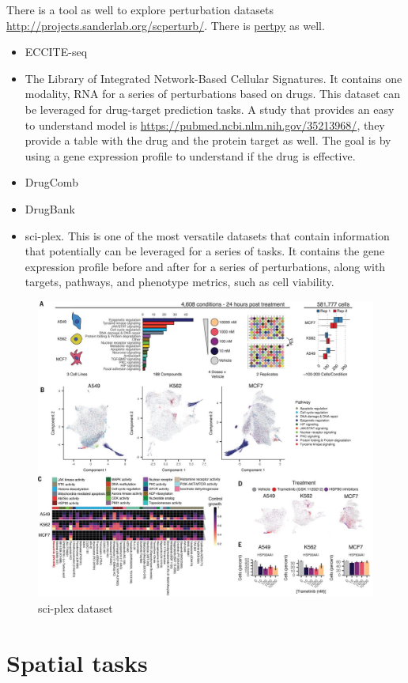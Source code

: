 \documentclass[12pt, a4paper]{article}
\begin{document}
There is a tool as well to explore perturbation datasets \url{http://projects.sanderlab.org/scperturb/}. There is \href{https://github.com/scverse/pertpy}{pertpy} as well.

\begin{itemize}
  \item ECCITE-seq
  \item The Library of Integrated Network-Based Cellular Signatures. It contains one modality, RNA for a series of perturbations based on drugs. This dataset can be leveraged for drug-target prediction tasks. A study that provides an easy to understand model is \url{https://pubmed.ncbi.nlm.nih.gov/35213968/}, they provide a table with the drug and the protein target as well. The goal is by using a gene expression profile to understand if the drug is effective.
  \item DrugComb
  \item DrugBank
  \item sci-plex. This is one of the most versatile datasets that contain information that potentially can be leveraged for a series of tasks. It contains the gene expression profile before and after for a series of perturbations, along with targets, pathways, and phenotype metrics, such as cell viability.
\end{itemize}

\begin{figure}[h!]
  \centering
  \includegraphics[width=.8\textwidth]{sci-plex.jpeg}
  \caption{sci-plex dataset}
\end{figure}

\section{Spatial tasks}
\end{document}

